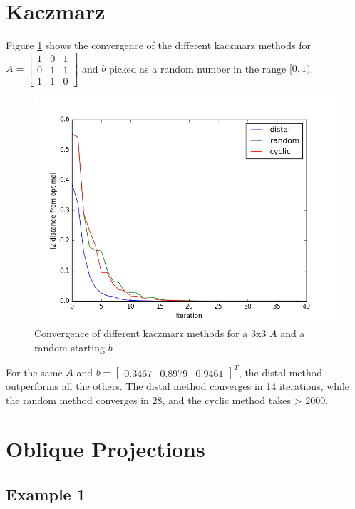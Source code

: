 \documentclass{article}
\begin{document}
\section{Kaczmarz}

Figure \ref{fig:kaczmarz} shows the convergence of the different kaczmarz methods for $A = \begin{bmatrix}1 & 0 & 1 \\ 0 & 1 & 1 \\ 1 & 1 & 0\end{bmatrix}$ and $b$ picked as a random number in the range $\lbrack 0, 1)$.

  \begin{figure}[!ht]
    \centering
    \includegraphics[width=\textwidth,keepaspectratio=true]{kaczmarz.png}
    \caption{Convergence of different kaczmarz methods for a 3x3 $A$ and a random starting $b$}
    \label{fig:kaczmarz}
\end{figure}

For the same $A$ and $b = \begin{bmatrix}0.3467 & 0.8979 & 0.9461\end{bmatrix}^T$, the distal method outperforms all the others. The distal method converges in 14 iterations, while the random method converges in 28, and the cyclic method takes > 2000.

\section{Oblique Projections}

\subsection{Example 1}
\end{document}
